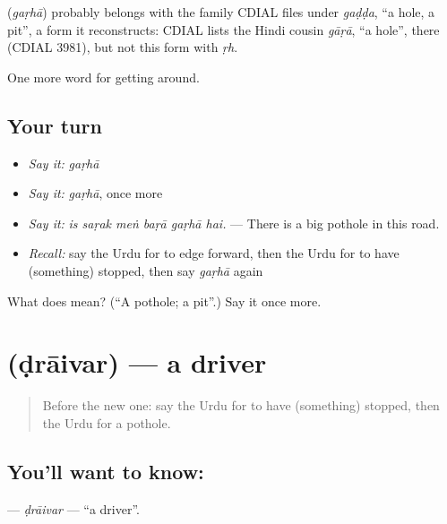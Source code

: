 \begin{cousinweb}
\textbf{} (\emph{gaṛhā}) probably belongs with the family CDIAL files under \emph{gaḍḍa}, \textquotedblleft{}a hole, a pit\textquotedblright{}, a form it reconstructs: CDIAL lists the Hindi cousin \emph{gāṛā}, \textquotedblleft{}a hole\textquotedblright{}, there (CDIAL 3981), but not this form with \emph{ṛh}.
\end{cousinweb}

\begin{grammarlens}[title={What you've built}]
One more word for getting around.
\end{grammarlens}

\subsection*{Your turn}
\begin{itemize}
\raggedright
  \item \emph{Say it:} \emph{gaṛhā}
  \item \emph{Say it:} \emph{gaṛhā}, once more
  \item \emph{Say it:} \emph{is saṛak meṅ baṛā gaṛhā hai.} — There is a big pothole in this road.
  \item \emph{Recall:} say the Urdu for to edge forward, then the Urdu for to have (something) stopped, then say \emph{gaṛhā} again
\end{itemize}

\begin{tcolorbox}[breakable,colback=teal!4,colframe=teal!35!black,title={Before you move on}]
What does  mean? (\textquotedblleft{}A pothole; a pit\textquotedblright{}.) Say it once more.
\end{tcolorbox}
\section[\texorpdfstring{\ur{ڈرائیور} (ḍrāivar)}{ڈرائیور (ḍrāivar)}]{ (ḍrāivar) — a driver}

\label{lesson:UR-C394-draivar}



\begin{quote}
Before the new one: say the Urdu for to have (something) stopped, then the Urdu for a pothole.
\end{quote}

\subsection*{You'll want to know: }
\textbf{} — \emph{ḍrāivar} — \textquotedblleft{}a driver\textquotedblright{}.

